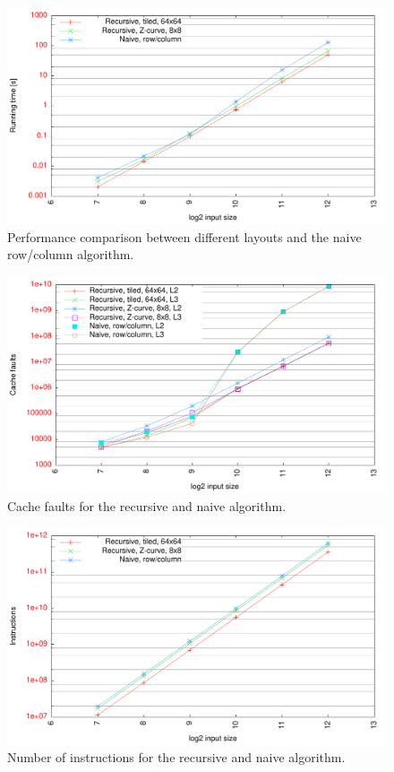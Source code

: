\begin{figure}[h!]
  \centering
  \includegraphics[width=\textwidth]{"../project2/gnuplots/recursive_performance"}
  \caption{Performance comparison between different layouts and the naive row/column algorithm.}
  \label{fig:recursive_layout_performance}
\end{figure}

\begin{figure}[h!]
  \centering
  \includegraphics[width=\textwidth]{"../project2/gnuplots/recursive_cache"}
  \caption{Cache faults for the recursive and naive algorithm.}
  \label{fig:recursive_layout_cachefaults}
\end{figure}

\begin{figure}[h!]
  \centering
  \includegraphics[width=\textwidth]{"../project2/gnuplots/recursive_instructions"}
  \caption{Number of instructions for the recursive and naive algorithm.}
  \label{fig:recursive_layout_instructions}
\end{figure}

